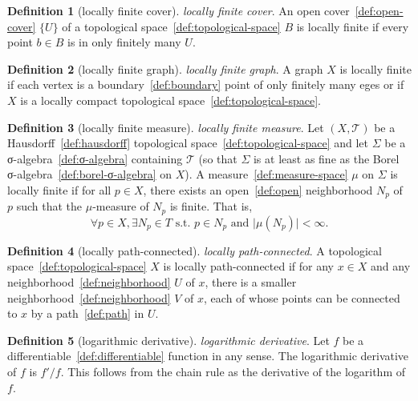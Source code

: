 \documentclass[12pt,a4paper]{article}
\theoremstyle{definition}
\newtheorem{definition}{Definition}
\begin{document}
\begin{definition}[locally finite cover]\label{def:locally-finite-cover}
\emph{locally finite cover}. An open cover~\ref{def:open-cover} $\{U\}$ of a topological space~\ref{def:topological-space} $B$ is locally finite if every point $b\in B$ is in only finitely many $U$.
\end{definition}

\begin{definition}[locally finite graph]\label{def:locally-finite-graph}
\emph{locally finite graph}. A graph $X$ is locally finite if each vertex is a boundary~\ref{def:boundary} point of only finitely many eges or if $X$ is a locally compact topological space~\ref{def:topological-space}.
\end{definition}

\begin{definition}[locally finite measure]\label{def:locally-finite-measure}
\emph{locally finite measure}. Let $(X,\mathcal T)$ be a Hausdorff~\ref{def:hausdorff} topological space~\ref{def:topological-space} and let $\Sigma$ be a σ-algebra~\ref{def:σ-algebra}  containing $\mathcal T$ (so that $\Sigma$ is at least as fine as the Borel σ-algebra~\ref{def:borel-σ-algebra} on $X$). A measure~\ref{def:measure-space} $\mu$ on $\Sigma$ is locally finite if for all $p \in X$, there exists an open~\ref{def:open} neighborhood $N_p$ of $p$ such that the $\mu$-measure of $N_p$ is finite. That is, $$\forall p \in X, \exists N_p \in T \text{ s.t. } p \in N_p \text{ and } \vert \mu(N_p)\vert  < \infty.$$
\end{definition}

\begin{definition}[locally path-connected]\label{def:locally-path-connected}
\emph{locally path-connected}. A topological space~\ref{def:topological-space} $X$ is locally path-connected if for any $x\in X$ and any neighborhood~\ref{def:neighborhood} $U$ of $x$, there is a smaller neighborhood~\ref{def:neighborhood} $V$ of $x$, each of whose points can be connected to $x$ by a path~\ref{def:path} in $U$.
\end{definition}

\begin{definition}[logarithmic derivative]\label{def:logarithmic-derivative}
\emph{logarithmic derivative}. Let $f$ be a differentiable~\ref{def:differentiable} function in any sense. The logarithmic derivative of $f$ is $f'/f$. This follows from the chain rule as the derivative of the logarithm of $f$.
\end{definition}
\end{document}
